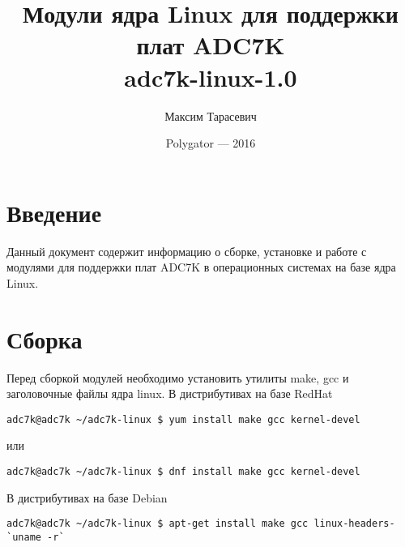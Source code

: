 \documentclass[a4paper]{article}
\title{Модули ядра Linux для поддержки плат ADC7K\\adc7k-linux-1.0}
\author{Максим Тарасевич}
\date{Polygator --- 2016}
\begin{document}
\maketitle

\newpage
\tableofcontents

\newpage
\section{Введение}

Данный документ содержит информацию о сборке, установке и работе с
модулями для поддержки плат ADC7K в операционных системах на базе ядра Linux.

\section{Сборка}

Перед сборкой модулей необходимо установить утилиты make, gcc и заголовочные
файлы ядра linux.
В дистрибутивах на базе RedHat
\begin{small}\begin{verbatim}
adc7k@adc7k ~/adc7k-linux $ yum install make gcc kernel-devel
\end{verbatim}\end{small}
или
\begin{small}\begin{verbatim}
adc7k@adc7k ~/adc7k-linux $ dnf install make gcc kernel-devel
\end{verbatim}\end{small}
В дистрибутивах на базе Debian
\begin{small}\begin{verbatim}
adc7k@adc7k ~/adc7k-linux $ apt-get install make gcc linux-headers-`uname -r`
\end{verbatim}\end{small}
\end{document}
